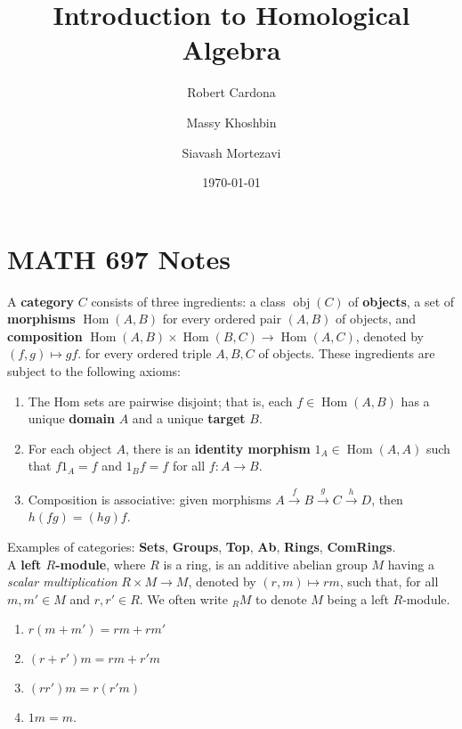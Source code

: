 \documentclass[8pt]{amsart}
\theoremstyle{plain}%
\theoremstyle{definition}
\theoremstyle{remark}
\numberwithin{equation}{section}
\newcommand{\obj}{\operatorname{obj}}
\newcommand{\Hom}{\operatorname{Hom}}
\begin{document}
\title[MATH 697]{Introduction to Homological Algebra}


\author{
	Robert Cardona %
	\and
	Massy Khoshbin %
	\and
	Siavash Mortezavi %
}


\address{Department of Mathematics \\ California State University Long Beach}

\date{\today}


\maketitle

\setcounter{section}{0}
\section{MATH 697 Notes}

A \textbf{category} $C$ consists of three ingredients: a class $\obj(C)$ of \textbf{objects}, a set of \textbf{morphisms} $\Hom(A, B)$ for every ordered pair $(A, B)$ of objects, and \textbf{composition} $\Hom(A, B) \times \Hom(B, C) \to \Hom(A, C)$, denoted by $(f, g) \mapsto gf$. for every ordered triple $A, B, C$ of objects. These ingredients are subject to the following axioms:
	\begin{enumerate}
		\item The Hom sets are pairwise disjoint; that is, each $f \in \Hom(A, B)$ has a unique \textbf{domain} $A$ and a unique \textbf{target} $B$.
		\item For each object $A$, there is an \textbf{identity morphism} $1_A \in \Hom(A, A)$ such that $f1_A = f$ and $1_Bf = f$ for all $f : A \to B$.
		\item Composition is associative: given morphisms $A \xrightarrow f B \xrightarrow g C \xrightarrow h D$, then $h(fg) = (hg)f$.\\
	\end{enumerate}

Examples of categories: \textbf{Sets}, \textbf{Groups}, \textbf{Top}, \textbf{Ab}, \textbf{Rings}, \textbf{ComRings}.\\

A \textbf{left $R$-module}, where $R$ is a ring, is an additive abelian group $M$ having a \textit{scalar multiplication} $R \times M \to M$, denoted by $(r, m) \mapsto rm$, such that, for all $m, m' \in M$ and $r, r' \in R$. We often write $_RM$ to denote $M$ being a left $R$-module.
	\begin{enumerate}
		\item $r(m + m') = rm + rm'$
		\item $(r + r')m = rm + r'm$
		\item $(rr')m = r(r'm)$
		\item $1m = m$.\\
	\end{enumerate}
\end{document}

